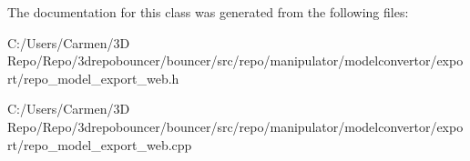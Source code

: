 The documentation for this class was generated from the following files\+:\begin{DoxyCompactItemize}
\item 
C\+:/\+Users/\+Carmen/3\+D Repo/\+Repo/3drepobouncer/bouncer/src/repo/manipulator/modelconvertor/export/repo\+\_\+model\+\_\+export\+\_\+web.\+h\item 
C\+:/\+Users/\+Carmen/3\+D Repo/\+Repo/3drepobouncer/bouncer/src/repo/manipulator/modelconvertor/export/repo\+\_\+model\+\_\+export\+\_\+web.\+cpp\end{DoxyCompactItemize}
